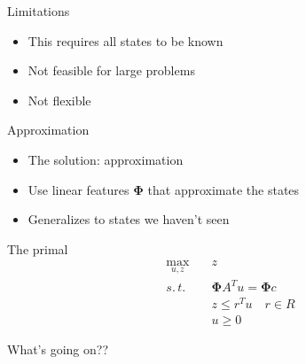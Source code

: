 \documentclass[9pt]{beamer}
\newcommand{\PHI}{\bm{\Phi}}
\begin{document}
\begin{frame}{Limitations}
\begin{itemize}
    \item This requires all states to be known
    \vfill
    \item Not feasible for large problems
    \vfill
    \item Not flexible
\end{itemize}
\end{frame}

\begin{frame}{Approximation}
\begin{itemize}
\item The solution: approximation
\vfill
\item Use linear features $\PHI$ that approximate the states
\vfill
\item Generalizes to states we haven't seen
\end{itemize}
\end{frame}

\begin{frame}{The primal}
\begin{equation}
\begin{aligned}
\max_{u,z}\quad & z \\
s.\,t.\quad & \PHI A^T u = \PHI c \\
&z \le r^Tu \quad r \in R \\
& u \ge 0
\end{aligned}
\end{equation}

What's going on??
\end{frame}
\end{document}

